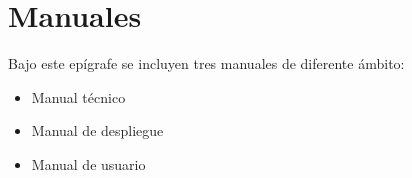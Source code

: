 
\chapter{Manuales}

Bajo este epígrafe se incluyen tres manuales de diferente ámbito:

\begin{itemize}
  \item Manual técnico
  \item Manual de despliegue
  \item Manual de usuario
\end{itemize}







